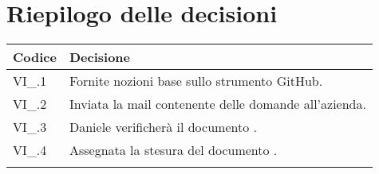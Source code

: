 \section{Riepilogo delle decisioni \hfil}
{
	\setlength{\freewidth}{\dimexpr\textwidth-4\tabcolsep}
	\renewcommand{\arraystretch}{1.5}
	\setlength{\aboverulesep}{0pt}
	\setlength{\belowrulesep}{0pt}
	\begin{longtable}{L{.3\freewidth} L{.7\freewidth}}
		\toprule 
		\textbf{Codice} & \textbf{Decisione}\\
		\toprule
		\endhead
		
		VI\_\DataMeeting{}.1 & Fornite nozioni base sullo strumento GitHub. \\  
		VI\_\DataMeeting{}.2 & Inviata la mail contenente delle domande all'azienda. \\ 
		VI\_\DataMeeting{}.3 & Daniele verificherà il documento \SdF. \\
		VI\_\DataMeeting{}.4 & Assegnata la stesura del documento \PdP. \\  		
		
		\bottomrule
		\hiderowcolors
	\end{longtable}
}
